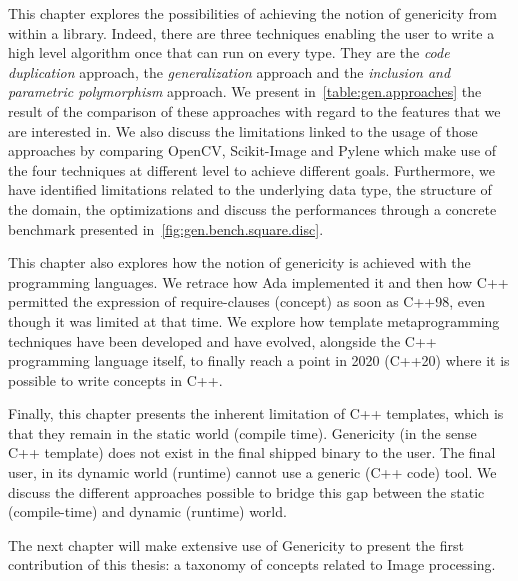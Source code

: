This chapter explores the possibilities of achieving the notion of genericity from within a library. Indeed, there are
three techniques enabling the user to write a high level algorithm once that can run on every type. They are the
\emph{code duplication} approach, the \emph{generalization} approach and the \emph{inclusion and parametric
  polymorphism} approach. We present in~\cref{table:gen.approaches} the result of the comparison of these approaches with
regard to the features that we are interested in. We also discuss the limitations linked to the usage of those
approaches by comparing OpenCV, Scikit-Image and Pylene which make use of the four techniques at different level to
achieve different goals. Furthermore, we have identified limitations related to the underlying data type, the structure of the
domain, the optimizations and discuss the performances through a concrete benchmark presented
in~\cref{fig:gen.bench.square.disc}.

This chapter also explores how the notion of genericity is achieved with the programming languages. We retrace how Ada
implemented it and then how C++ permitted the expression of require-clauses (concept) as soon as C++98, even though it
was limited at that time. We explore how template metaprogramming techniques have been developed and have evolved,
alongside the C++ programming language itself, to finally reach a point in 2020 (C++20) where it is possible to write
concepts in C++.

Finally, this chapter presents the inherent limitation of C++ templates, which is that they remain in the static world
(compile time). Genericity (in the sense C++ template) does not exist in the final shipped binary to the user. The final
user, in its dynamic world (runtime) cannot use a generic (C++ code) tool. We discuss the different approaches possible
to bridge this gap between the static (compile-time) and dynamic (runtime) world.

The next chapter will make extensive use of Genericity to present the first contribution of this thesis: a taxonomy of
concepts related to Image processing.
